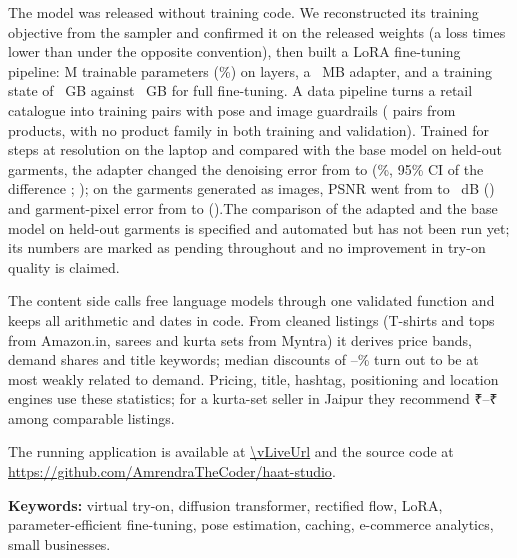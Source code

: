 \documentclass[12pt,a4paper,oneside]{report}
\newcommand{\rupee}{{\rupeefont ₹}}
\begin{document}
The model was released without training code. We reconstructed its training objective from the sampler and confirmed it on the released weights (a loss \vLossRatio{} times lower than under the opposite convention), then built a LoRA fine-tuning pipeline: \vTrainParamsM{}M trainable parameters (\vLoraPct{}\%) on \vLoraLayers{} layers, a \vAdapterMb{}~MB adapter, and a training state of \vLoraStateGb{}~GB against \vFullStateGb{}~GB for full fine-tuning. A data pipeline turns a retail catalogue into training pairs with pose and image guardrails\ifPairs{} (\vPairsN{} pairs from \vPairsProducts{} products, with no product family in both training and validation)\fi. \ifLora Trained for \vLcSteps{} steps at \vLcScale{} resolution on the laptop and compared with the base model on \vLcN{} held-out garments, the adapter changed the denoising error from \vLcDlBase{} to \vLcDlLora{} (\vLcDlRel{}\%, 95\% CI of the difference \vLcDlCi{}; \vLcDlVerdict{}); on the \vLcGen{} garments generated as images, PSNR went from \vLcPsnrBase{} to \vLcPsnrLora{}~dB (\vLcPsnrVerdict{}) and garment-pixel error from \vLcGlBase{} to \vLcGlLora{} (\vLcGlVerdict{}).\else The comparison of the adapted and the base model on held-out garments is specified and automated but has not been run yet; its numbers are marked as pending throughout and no improvement in try-on quality is claimed.\fi

The content side calls free language models through one validated function and keeps all arithmetic and dates in code. \ifMarket From \vMkTotalClean{} cleaned listings (T-shirts and tops from Amazon.in, sarees and kurta sets from Myntra) it derives price bands, demand shares and title keywords; median discounts of \vMkTeeDisc{}--\vMkKurtaDisc{}\% turn out to be at most weakly related to demand. Pricing, title, hashtag, positioning and location engines use these statistics; for a kurta-set seller in Jaipur they recommend \rupee\vExBandLo{}--\rupee\vExBandHi{} among \vExComparables{} comparable listings.\fi

\ifLive The running application is available at \url{\vLiveUrl} and the source code at \url{https://github.com/AmrendraTheCoder/haat-studio}.\fi

\vspace{6pt}\noindent\textbf{Keywords:} virtual try-on, diffusion transformer, rectified flow, LoRA, parameter-efficient fine-tuning, pose estimation, caching, e-commerce analytics, small businesses.

\cleardoublepage
\tableofcontents
\clearpage
{}
\listoffigures
\clearpage
{}
\listoftables
\clearpage
\end{document}
